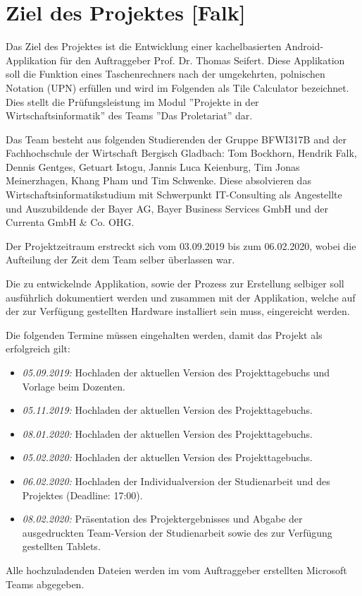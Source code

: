 \section{Ziel des Projektes [Falk]}

Das Ziel des Projektes ist die Entwicklung einer kachelbasierten Android-Applikation für den Auftraggeber Prof. Dr. Thomas Seifert. Diese Applikation soll die Funktion eines Taschenrechners nach der umgekehrten, polnischen Notation (UPN) erfüllen und wird im Folgenden als Tile Calculator bezeichnet. Dies stellt die Prüfungsleistung im Modul ''Projekte in der Wirtschaftsinformatik'' des Teams ''Das Proletariat'' dar. 

Das Team besteht aus folgenden Studierenden der Gruppe BFWI317B and der Fachhochschule der Wirtschaft Bergisch Gladbach: Tom Bockhorn, Hendrik Falk, Dennis Gentges, Getuart Istogu, Jannis Luca Keienburg, Tim Jonas Meinerzhagen, Khang Pham und Tim Schwenke. Diese absolvieren das Wirtschaftsinformatikstudium mit Schwerpunkt IT-Consulting als Angestellte und Auszubildende der Bayer AG, Bayer Business Services GmbH und der Currenta GmbH \& Co. OHG.

Der Projektzeitraum erstreckt sich vom 03.09.2019 bis zum 06.02.2020, wobei die Aufteilung der Zeit dem Team selber überlassen war.

Die zu entwickelnde Applikation, sowie der Prozess zur Erstellung selbiger soll ausführlich dokumentiert werden und zusammen mit der Applikation, welche auf der zur Verfügung gestellten Hardware installiert sein muss, eingereicht werden. 

Die folgenden Termine müssen eingehalten werden, damit das Projekt als erfolgreich gilt: 

\begin{itemize}
	\item \textit{05.09.2019:} Hochladen der aktuellen Version des Projekttagebuchs und Vorlage beim Dozenten.
	\item \textit{05.11.2019:} Hochladen der aktuellen Version des Projekttagebuchs.
	\item \textit{08.01.2020:} Hochladen der aktuellen Version des Projekttagebuchs.
	\item \textit{05.02.2020:} Hochladen der aktuellen Version des Projekttagebuchs.
	\item \textit{06.02.2020:} Hochladen der Individualversion der Studienarbeit und des Projektes (Deadline: 17:00).
	\item \textit{08.02.2020:} Präsentation des Projektergebnisses und Abgabe der ausgedruckten Team-Version der Studienarbeit sowie des zur Verfügung gestellten Tablets.
\end{itemize}

Alle hochzuladenden Dateien werden im vom Auftraggeber erstellten Microsoft Teams abgegeben.